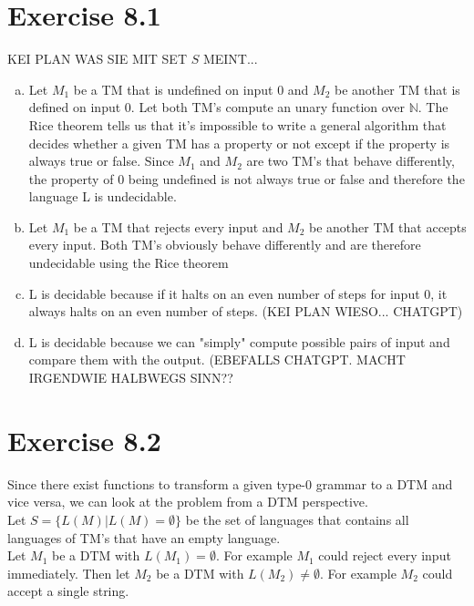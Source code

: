 \documentclass{article} %
\newcommand{\homeworkNumber}{8}
\begin{document}
\section*{Exercise \homeworkNumber.1}

KEI PLAN WAS SIE MIT SET $S$ MEINT...

\begin{enumerate}[(a)]
\item Let $M_1$ be a TM that is undefined on input $0$ and $M_2$ be another TM that is defined on input $0$. Let both TM's compute an unary function over $\mathbb{N}$. The Rice theorem tells us that it's impossible to write a general algorithm that decides whether a given TM has a property or not except if the property is always true or false. Since $M_1$ and $M_2$ are two TM's that behave differently, the property of $0$ being undefined is not always true or false and therefore the language L is undecidable.\\

\item Let $M_1$ be a TM that rejects every input and $M_2$ be another TM that accepts every input. Both TM's obviously behave differently and are therefore undecidable using the Rice theorem\\

\item L is decidable because if it halts on an even number of steps for input 0, it always halts on an even number of steps. (KEI PLAN WIESO... CHATGPT)\\

\item L is decidable because we can "simply" compute possible pairs of input and compare them with the output. (EBEFALLS CHATGPT. MACHT IRGENDWIE HALBWEGS SINN??\\
\end{enumerate}

\section*{Exercise \homeworkNumber.2}
Since there exist functions to transform a given type-0 grammar to a DTM and vice versa, we can look at the problem from a DTM perspective.\\
Let $S = \lbrace L(M) \vert L(M) = \emptyset \rbrace$ be the set of languages that contains all languages of TM's that have an empty language.\\

Let $M_1$ be a DTM with $L(M_1) = \emptyset$. For example $M_1$ could reject every input immediately. Then let $M_2$ be a DTM with $L(M_2) \neq \emptyset$. For example $M_2$ could accept a single string.\\
\end{document}
